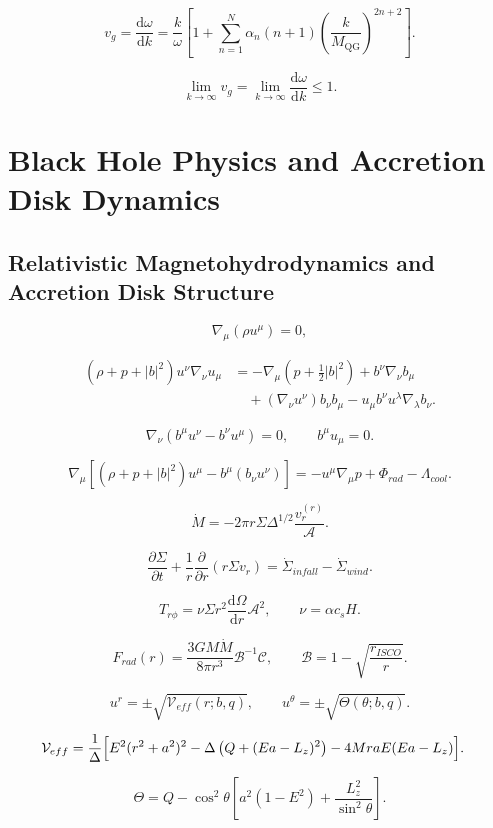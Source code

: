 \documentclass[11pt,a4paper]{article}
\newcommand{\A}{\mathcal{A}}
\newcommand{\B}{\mathcal{B}}
\newcommand{\C}{\mathcal{C}}
\newcommand{\V}{\mathcal{V}}
\newcommand{\dd}{\mathrm{d}}
\begin{document}
\[
v_g=\frac{\dd\omega}{\dd k}
=\frac{k}{\omega}\left[1+\sum_{n=1}^{N}\alpha_n(n+1)
\left(\frac{k}{M_{\mathrm{QG}}}\right)^{2n+2}\right].
\]

\[
\lim_{k\to\infty}v_g=\lim_{k\to\infty}\frac{\dd\omega}{\dd k}\le 1.
\]

\section{Black Hole Physics and Accretion Disk Dynamics}

\subsection{Relativistic Magnetohydrodynamics and Accretion Disk Structure}

\[
\nabla_\mu(\rho u^\mu)=0,
\]

\begin{align*}
(\rho+p+|b|^2)u^\nu\nabla_\nu u_\mu
&=-\nabla_\mu\left(p+\frac12|b|^2\right)+b^\nu\nabla_\nu b_\mu\\
&\quad+(\nabla_\nu u^\nu)b_\nu b_\mu
-u_\mu b^\nu u^\lambda\nabla_\lambda b_\nu .
\end{align*}

\[
\nabla_\nu\left(b^\mu u^\nu-b^\nu u^\mu\right)=0,\qquad
b^\mu u_\mu=0.
\]

\[
\nabla_\mu\left[(\rho+p+|b|^2)u^\mu-b^\mu(b_\nu u^\nu)\right]
=-u^\mu\nabla_\mu p+\Phi_{rad}-\Lambda_{cool}.
\]

\[
\dot M=-2\pi r\Sigma\Delta^{1/2}\frac{v_r^{(r)}}{\A}.
\]

\[
\frac{\partial\Sigma}{\partial t}
+\frac1r\frac{\partial}{\partial r}\left(r\Sigma v_r\right)
=\dot\Sigma_{infall}-\dot\Sigma_{wind}.
\]

\[
T_{r\phi}=\nu\Sigma r^2\frac{\dd\Omega}{\dd r}\A^2,
\qquad
\nu=\alpha c_sH.
\]

\[
F_{rad}(r)=\frac{3GM\dot M}{8\pi r^3}\B^{-1}\C,
\qquad
\B=1-\sqrt{\frac{r_{ISCO}}{r}}.
\]

\[
u^r=\pm\sqrt{\V_{eff}(r;b,q)},\qquad
u^\theta=\pm\sqrt{\Theta(\theta;b,q)}.
\]

\begin{align*}
\V_{eff}
&=\frac{1}{\Delta}\Bigl[E^2(r^2+a^2)^2
-\Delta\left(Q+(Ea-L_z)^2\right)
-4MraE(Ea-L_z)\Bigr].
\end{align*}

\[
\Theta=Q-\cos^2\theta\left[a^2(1-E^2)
+\frac{L_z^2}{\sin^2\theta}\right].
\]
\end{document}
